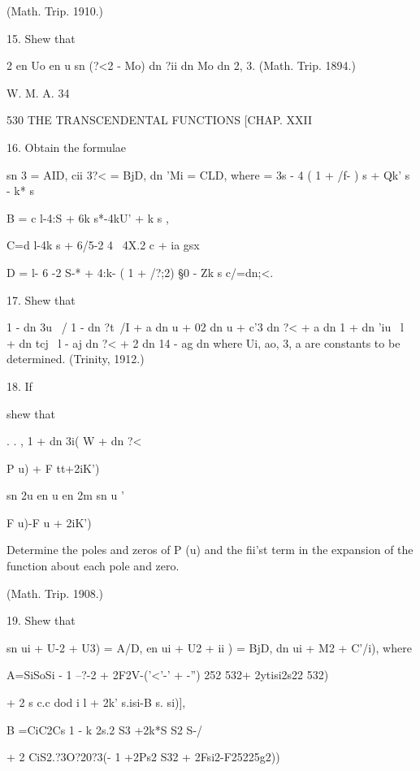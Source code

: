 (Math. Trip. 1910.)

15. Shew that

2 en Uo en u sn (?<2 - %
Mo) dn ?ii dn Mo dn %
2, 3. (Math. Trip. 1894.)

W. M. A. 34



530 THE TRANSCENDENTAL FUNCTIONS [CHAP. XXII

16. Obtain the formulae

sn 3 = AID, cii 3?< = BjD, dn 'Mi = CLD, where = 3s - 4 ( 1 + /f- ) s
+ Qk' s - k* s%

B = c l-4:S + 6k s*-4kU' + k s ,

C=d l-4k s + 6/5-2 4 \ 4X.2 c + ia gsx

D = l- 6 -2 S-* + 4:k- ( 1 + /?;2) §0 - Zk s%
c/=dn;<.

17. Shew that

1 - dn 3u \ / 1 - dn ?t\ /I + a dn u + 02 dn u + c'3 dn ?< + a dn 1 +
dn 'iu \ l + dn tcj \ l - aj dn ?< + 2 dn 14 - ag dn %
where Ui, ao, 3, a are constants to be determined. (Trinity, 1912.)



18. If



shew that



  . . , 1 + dn 3i( W + dn ?<



P u) + F tt+2iK')



sn 2u en u en 2m sn u '



F u)-F u + 2iK')

Determine the poles and zeros of P (u) and the fii'st term in the
expansion of the function about each pole and zero.

(Math. Trip. 1908.)

19. Shew that

sn ui + U-2 + U3) = A/D, en ui + U2 + ii ) = BjD, dn ui + M2 + %
C'/i), where

A=SiSoSi - 1 --?-2 + 2F2V-('<'-' + -'') 252 532+ 2ytisi2s22 532)

+ 2 s c.c dod i l + 2k' s.isi-B s. si)],

B =CiC2Cs 1 - k 2s.2 S3 +2k*S S2 S-/

+ 2 CiS2.?3O?20?3(- 1 +2Ps2 S32 + 2Fsi2-F25225g2))


